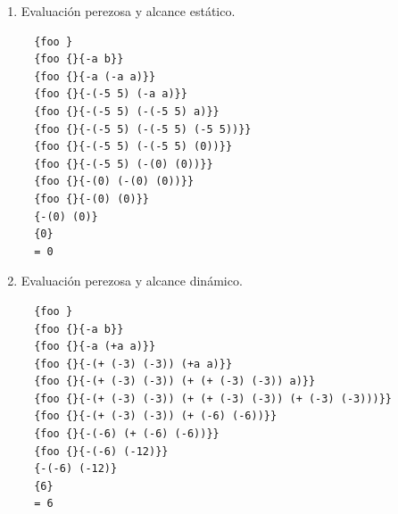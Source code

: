 \begin{enumerate}
\item Evaluación perezosa y alcance estático.
  \begin{lstlisting}
  {foo }
  {foo {}{-a b}}
  {foo {}{-a (-a a)}}
  {foo {}{-(-5 5) (-a a)}}
  {foo {}{-(-5 5) (-(-5 5) a)}}
  {foo {}{-(-5 5) (-(-5 5) (-5 5))}}
  {foo {}{-(-5 5) (-(-5 5) (0))}}
  {foo {}{-(-5 5) (-(0) (0))}}
  {foo {}{-(0) (-(0) (0))}}
  {foo {}{-(0) (0)}}
  {-(0) (0)}
  {0}
  = 0
\end{lstlisting}
  \item Evaluación perezosa y alcance dinámico.
  \begin{lstlisting}
  {foo }
  {foo {}{-a b}}
  {foo {}{-a (+a a)}}
  {foo {}{-(+ (-3) (-3)) (+a a)}}
  {foo {}{-(+ (-3) (-3)) (+ (+ (-3) (-3)) a)}}
  {foo {}{-(+ (-3) (-3)) (+ (+ (-3) (-3)) (+ (-3) (-3)))}}
  {foo {}{-(+ (-3) (-3)) (+ (-6) (-6))}}
  {foo {}{-(-6) (+ (-6) (-6))}}
  {foo {}{-(-6) (-12)}}
  {-(-6) (-12)}
  {6}
  = 6


\end{lstlisting}
\end{enumerate}
